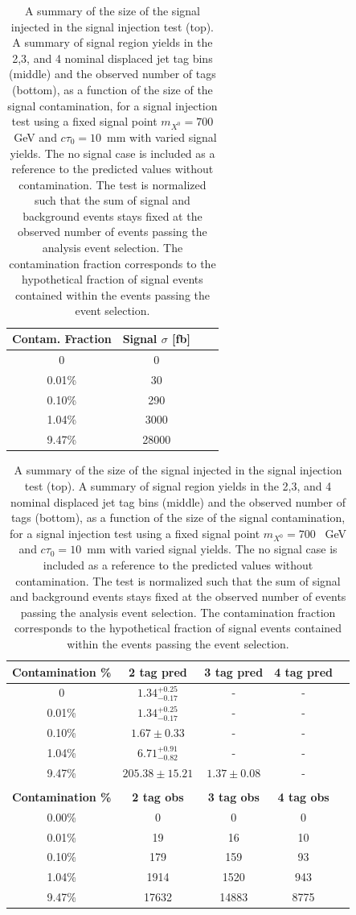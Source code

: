 \begin{table}[tb]
  \caption{A summary of the size of the signal injected in the signal injection test (top).
    A summary of signal region yields in the 2,3, and 4 nominal displaced jet tag bins (middle) and  the
    observed number of tags (bottom), as a function of the
    size of the signal contamination, for a signal injection test using a fixed
    signal point $m_{X^0} = 700$ ~GeV and $c\tau_0 = 10$~mm with
    varied signal yields. The no signal case is included as a reference to 
    the predicted values without contamination. The test is normalized such that the sum of signal and background
     events stays fixed at the observed number of events passing the analysis event selection.
    The contamination fraction corresponds to the hypothetical fraction of signal events contained within
     the events passing the event selection.  
    \label{tab:700_injection_summary_norm}}
\begin{center}
\begin{tabular}{cccc}
\textbf{Contam. Fraction} & \textbf{Signal} $\sigma$ [fb] \\ 
\hline
 0 & 0 \\
 0.01\% & 30 \\
 0.10\% & 290 \\
 1.04\% & 3000 \\
 9.47\% & 28000 \\
\end{tabular} 
\begin{tabular}{ccccc}
\textbf{Contamination \%} & \textbf{2 tag pred} & \textbf{3 tag pred} &\textbf{4 tag pred} \\
\hline
 0 &  $1.34^{+0.25}_{-0.17}$ & - & - \\ 
 0.01\% & $1.34^{+0.25}_{-0.17}$ & - & - \\
 0.10\% & $1.67\pm0.33$ & - & - \\
 1.04\% & $6.71^{+0.91}_{-0.82}$ &- & - \\
 9.47\% & $205.38\pm15.21$ & $1.37\pm0.08$ & - \\ 
\\
\textbf{Contamination \%} &  \textbf{2 tag obs} & \textbf{3 tag obs} & \textbf{4 tag obs} \\
\hline
0.00\% & 0 & 0 & 0 \\
0.01\% &  19 & 16 & 10 \\ 
0.10\% &  179 & 159 & 93 \\
1.04\% &  1914 & 1520 & 943   \\
9.47\% &  17632  & 14883 & 8775   \\
\end{tabular} 
\end{center}
\end{table}

